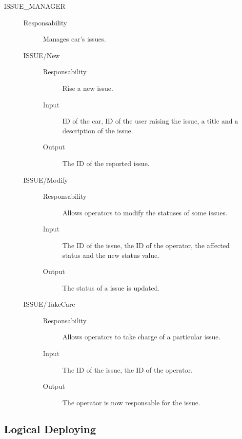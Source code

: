 \documentclass[11pt]{article} %
\begin{document}
\begin{description}
	\item[ISSUE\_MANAGER] \hfill
	\begin{description}
		\item[Responsability] Manages car's issues.
	\item[ISSUE/New] \hfill
		\begin{description}
			\item[Responsability] Rise a new issue.
			\item[Input] ID of the car, ID of the user raising the issue, a title and a description of the issue.
			\item[Output] The ID of the reported issue.
		\end{description}
	\item[ISSUE/Modify] \hfill
		\begin{description}
			\item[Responsability] Allows operators to modify the statuses of some issues.\\ {}
			\item[Input] The ID of the issue, the ID of the operator, the affected status and the new status value.
			\item[Output] The status of a issue is updated.
		\end{description}
	\item[ISSUE/TakeCare] \hfill
		\begin{description}
			\item[Responsability] Allows operators to take charge of a particular issue.
			\item[Input] The ID of the issue, the ID of the operator.
			\item[Output] The operator is now responsable for the issue.
		\end{description}
	\end{description}

\end{description}



\subsection{Logical Deploying}
\end{document}
